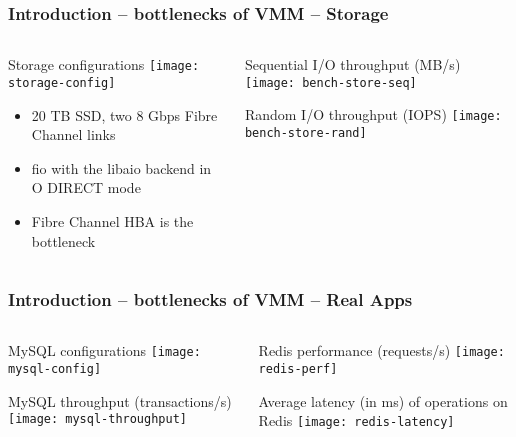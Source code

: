 \begin{frame}[plain]
	\frametitle{Introduction -- bottlenecks of VMM -- Storage }
	
	
	
	\begin{columns}
		
		\begin{column}{.4\textwidth}
			
			Storage configurations
			\texttt{[image: storage-config]}
			
			
			\small
			
			\begin{itemize}
			\item  20 TB SSD, two 8 Gbps Fibre Channel links
			\item  fio with the	libaio backend in O DIRECT mode 
			\item Fibre Channel HBA is the bottleneck

				
			\end{itemize}
			
		\end{column}
		
		\begin{column}{.6\textwidth}
			\centering
			Sequential I/O throughput (MB/s)
			\texttt{[image: bench-store-seq]}
			
			 Random I/O throughput (IOPS)
			\texttt{[image: bench-store-rand]}
		\end{column}
		
		
	\end{columns}
	
	
\end{frame}


\begin{frame}[plain]
	\frametitle{Introduction -- bottlenecks of VMM -- Real Apps }
	
	
	
	\begin{columns}
		
		\begin{column}{.5\textwidth}
						\centering
			
			MySQL configurations
			\texttt{[image: mysql-config]}
			
			MySQL throughput (transactions/s)
			\texttt{[image: mysql-throughput]}
			\small

			
		\end{column}
		
		\begin{column}{.5\textwidth}
			\centering
			Redis performance (requests/s) 
			\texttt{[image: redis-perf]}
			
			Average latency (in ms) of operations on  Redis
			\texttt{[image: redis-latency]}
		\end{column}
		
		
	\end{columns}
	
	
\end{frame}


